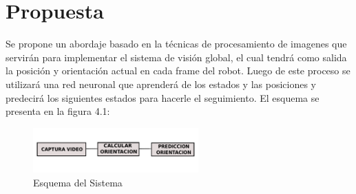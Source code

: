 
\chapter{Propuesta}
Se propone un abordaje basado en la t\'ecnicas de procesamiento de imagenes que servir\'an para implementar el sistema de visi\'on global, el cual tendr\'a como salida la posici\'on y orientaci\'on actual en cada frame del robot. Luego de este proceso se utilizar\'a una red neuronal  que aprender\'a de los estados y las posiciones y predecir\'a los siguientes estados para hacerle el seguimiento. El esquema se presenta en la figura 4.1: \\
	\begin{figure}
	\centering
	\includegraphics[width=2.5in]{esquema.pdf}
	
	\caption{Esquema del Sistema}
	\label{fig_mar}
\end{figure}
